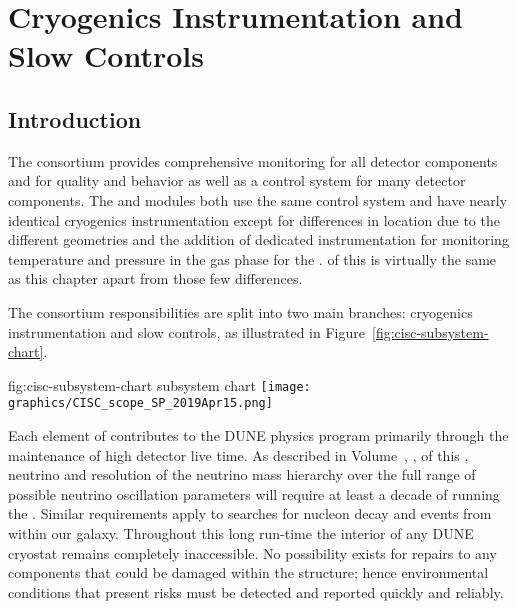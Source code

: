 \chapter{Cryogenics Instrumentation and Slow Controls}
\label{ch:sp-cisc}


\section{Introduction} 

The  consortium provides comprehensive monitoring for all detector  components and for  quality and behavior as well as a control system for many detector components.
The  and  modules both use the same control
system and have nearly identical cryogenics instrumentation except
for differences in location due to the different 
geometries and the addition of dedicated instrumentation for
monitoring temperature and pressure in the gas phase for the
.  \dpchcisc %
of this
 is virtually the same as this chapter apart from
those few differences.


The consortium responsibilities are split into 
two main branches: cryogenics instrumentation and slow controls, as illustrated in  Figure~\ref{fig:cisc-subsystem-chart}. %

\begin{dunefigure}{fig:cisc-subsystem-chart}
  { subsystem chart}
  \texttt{[image: graphics/CISC\_scope\_SP\_2019Apr15.png]}
\end{dunefigure}

Each element of  contributes to the DUNE physics program primarily through the maintenance of high detector live time.  As described in Volume~\volnumberphysics{}, \voltitlephysics{}, of this , neutrino  and resolution of the neutrino mass hierarchy over the full range of possible neutrino oscillation parameters will require at least a decade of running the .  Similar requirements apply to searches for nucleon decay and  events from within our galaxy.  Throughout this long run-time the interior of any DUNE cryostat remains completely inaccessible.  No possibility exists for repairs to any components that could be damaged within the  structure; hence environmental conditions that present risks must be detected and reported quickly and reliably. 
 
